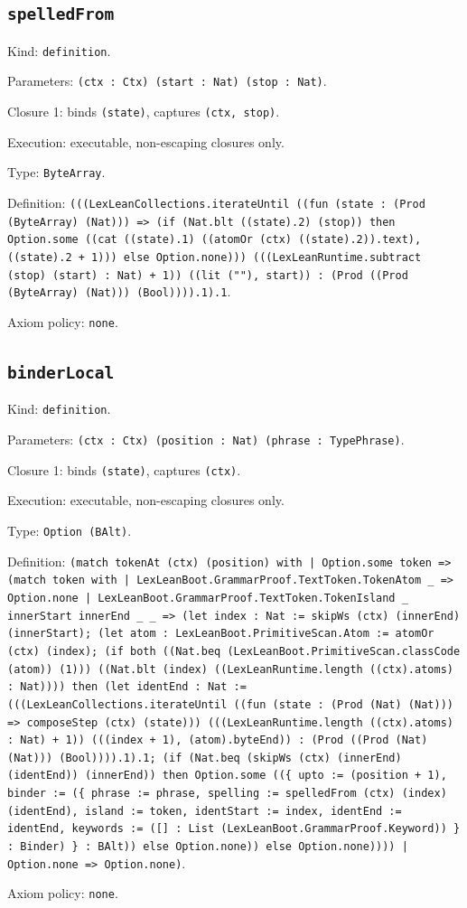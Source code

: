 \documentclass[11pt]{article}
\begin{document}
\subsection*{\texttt{spelledFrom}}
\noindent Kind: \texttt{definition}.\par
\noindent Parameters: \texttt{(ctx : Ctx) (start : Nat) (stop : Nat)}.\par
\noindent Closure 1: binds \texttt{(state)}, captures \texttt{(ctx, stop)}.\par
\noindent Execution: executable, non-escaping closures only.\par
\noindent Type: \texttt{ByteArray}.\par
\noindent Definition: \texttt{(((LexLeanCollections.iterateUntil ((fun (state : (Prod (ByteArray) (Nat))) => (if (Nat.blt ((state).2) (stop)) then Option.some ((cat ((state).1) ((atomOr (ctx) ((state).2)).text), ((state).2 + 1))) else Option.none))) (((LexLeanRuntime.subtract (stop) (start) : Nat) + 1)) ((lit (""), start)) : (Prod ((Prod (ByteArray) (Nat))) (Bool)))).1).1}.\par
\noindent Axiom policy: \texttt{none}.\par
\subsection*{\texttt{binderLocal}}
\noindent Kind: \texttt{definition}.\par
\noindent Parameters: \texttt{(ctx : Ctx) (position : Nat) (phrase : TypePhrase)}.\par
\noindent Closure 1: binds \texttt{(state)}, captures \texttt{(ctx)}.\par
\noindent Execution: executable, non-escaping closures only.\par
\noindent Type: \texttt{Option (BAlt)}.\par
\noindent Definition: \texttt{(match tokenAt (ctx) (position) with | Option.some token => (match token with | LexLeanBoot.GrammarProof.TextToken.TokenAtom \_ => Option.none | LexLeanBoot.GrammarProof.TextToken.TokenIsland \_ innerStart innerEnd \_ \_ => (let index : Nat := skipWs (ctx) (innerEnd) (innerStart); (let atom : LexLeanBoot.PrimitiveScan.Atom := atomOr (ctx) (index); (if both ((Nat.beq (LexLeanBoot.PrimitiveScan.classCode (atom)) (1))) ((Nat.blt (index) ((LexLeanRuntime.length ((ctx).atoms) : Nat)))) then (let identEnd : Nat := (((LexLeanCollections.iterateUntil ((fun (state : (Prod (Nat) (Nat))) => composeStep (ctx) (state))) (((LexLeanRuntime.length ((ctx).atoms) : Nat) + 1)) (((index + 1), (atom).byteEnd)) : (Prod ((Prod (Nat) (Nat))) (Bool)))).1).1; (if (Nat.beq (skipWs (ctx) (innerEnd) (identEnd)) (innerEnd)) then Option.some ((\{ upto := (position + 1), binder := (\{ phrase := phrase, spelling := spelledFrom (ctx) (index) (identEnd), island := token, identStart := index, identEnd := identEnd, keywords := ([] : List (LexLeanBoot.GrammarProof.Keyword)) \} : Binder) \} : BAlt)) else Option.none)) else Option.none)))) | Option.none => Option.none)}.\par
\noindent Axiom policy: \texttt{none}.\par
\end{document}
